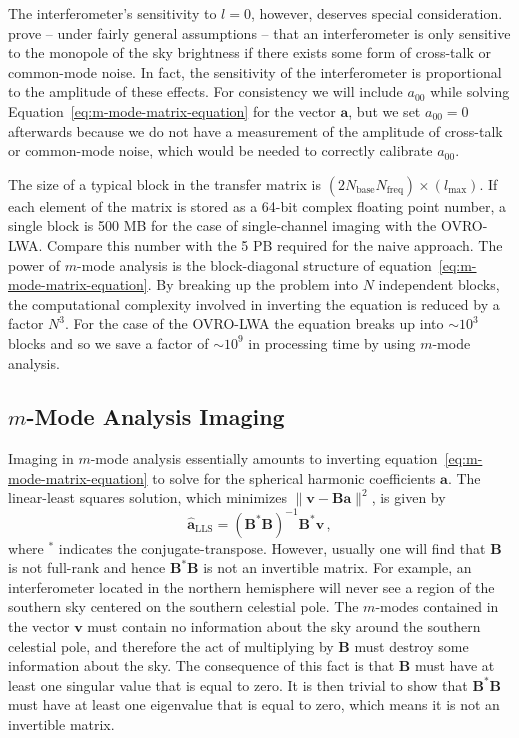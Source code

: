 \documentclass[twocolumn]{aastex6}
\renewcommand{\b}{\pmb}
\begin{document}
The interferometer's sensitivity to $l=0$, however, deserves special consideration.
\citet{2016ApJ...826..116V} prove -- under fairly general assumptions -- that an interferometer is
only sensitive to the monopole of the sky brightness if there exists some form of cross-talk or
common-mode noise. In fact, the sensitivity of the interferometer is proportional to the amplitude
of these effects. For consistency we will include $a_{00}$ while solving
Equation~\ref{eq:m-mode-matrix-equation} for the vector $\b a$, but we set $a_{00} = 0$ afterwards
because we do not have a measurement of the amplitude of cross-talk or common-mode noise, which
would be needed to correctly calibrate $a_{00}$.

The size of a typical block in the transfer matrix is
$(2N_\text{base}N_\text{freq})\times(l_\text{max})$. If each element of the matrix is stored as a
64-bit complex floating point number, a single block is 500 MB for the case of single-channel
imaging with the OVRO-LWA. Compare this number with the 5 PB required for the naive approach.  The
power of $m$-mode analysis is the block-diagonal structure of
equation~\ref{eq:m-mode-matrix-equation}.  By breaking up the problem into $N$ independent blocks,
the computational complexity involved in inverting the equation is reduced by a factor $N^3$. For
the case of the OVRO-LWA the equation breaks up into $\sim10^3$ blocks and so we save a factor of
$\sim10^9$ in processing time by using $m$-mode analysis.

\subsection{$m$-Mode Analysis Imaging}

Imaging in $m$-mode analysis essentially amounts to inverting
equation~\ref{eq:m-mode-matrix-equation} to solve for the spherical harmonic coefficients $\b a$.
The linear-least squares solution, which minimizes $\|\b v - \b B\b a\|^2$, is given by
\begin{equation}
    \b{\hat a}_\text{LLS} = (\b B^*\b B)^{-1}\b B^*\b v\,,
\end{equation}
where $^*$ indicates the conjugate-transpose. However, usually one will find that $\b B$ is not
full-rank and hence $\b B^*\b B$ is not an invertible matrix. For example, an interferometer located
in the northern hemisphere will never see a region of the southern sky centered on the southern
celestial pole. The $m$-modes contained in the vector $\b v$ must contain no information
about the sky around the southern celestial pole, and therefore the act of multiplying by $\b B$
must destroy some information about the sky. The consequence of this fact is that $\b B$ must have
at least one singular value that is equal to zero. It is then trivial to show that $\b B^*\b B$ must
have at least one eigenvalue that is equal to zero, which means it is not an invertible matrix.
\end{document}

